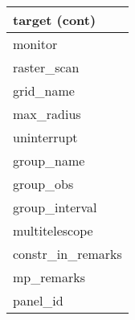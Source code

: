\documentclass{article}
\begin{document}

\begin{tabular}{|l|} \hline
\textbf{target (cont)} \\ \hline
monitor \\ \hline
raster\_scan \\ \hline
grid\_name \\ \hline
max\_radius \\ \hline
uninterrupt \\ \hline
group\_name \\ \hline
group\_obs \\ \hline
group\_interval \\ \hline
multitelescope \\ \hline
constr\_in\_remarks \\ \hline
mp\_remarks \\ \hline
panel\_id \\ \hline
\end{tabular}
\end{document}

